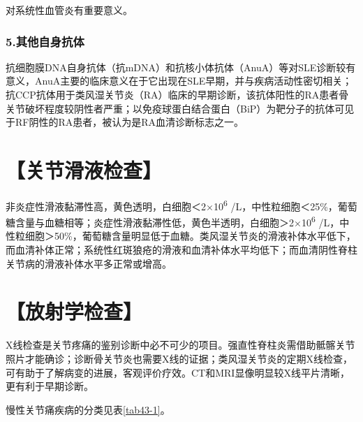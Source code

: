 对系统性血管炎有重要意义。

\subsubsection{5.其他自身抗体}

抗细胞膜DNA自身抗体（抗mDNA）和抗核小体抗体（AnuA）等对SLE诊断较有意义，AnuA主要的临床意义在于它出现在SLE早期，并与疾病活动性密切相关；抗CCP抗体用于类风湿关节炎（RA）临床的早期诊断，该抗体阳性的RA患者骨关节破坏程度较阴性者严重；以免疫球蛋白结合蛋白（BiP）为靶分子的抗体可见于RF阴性的RA患者，被认为是RA血清诊断标志之一。

\section{【关节滑液检查】}

非炎症性滑液黏滞性高，黄色透明，白细胞＜2×10\textsuperscript{6}
/L，中性粒细胞＜25\%，葡萄糖含量与血糖相等；炎症性滑液黏滞性低，黄色半透明，白细胞＞2×10\textsuperscript{6}
/L，中性粒细胞＞50\%，葡萄糖含量明显低于血糖。类风湿关节炎的滑液补体水平低下，而血清补体正常；系统性红斑狼疮的滑液和血清补体水平均低下；而血清阴性脊柱关节病的滑液补体水平多正常或增高。

\section{【放射学检查】}

X线检查是关节疼痛的鉴别诊断中必不可少的项目。强直性脊柱炎需借助骶髂关节照片才能确诊；诊断骨关节炎也需要X线的证据；类风湿关节炎的定期X线检查，可有助于了解病变的进展，客观评价疗效。CT和MRI显像明显较X线平片清晰，更有利于早期诊断。

慢性关节痛疾病的分类见表\ref{tab43-1}。

